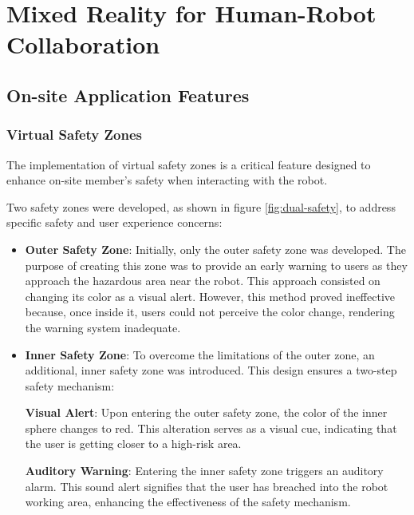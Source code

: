 \chapter{Mixed Reality for Human-Robot Collaboration}%
\label{chapter:on-site}



\section{On-site Application Features}
\label{section:on-site-features}


    
    \subsection{Virtual Safety Zones}
    \label{subsection:virtual-safety-zones} 

        The implementation of virtual safety zones is a critical feature designed to enhance on-site member's safety when interacting with the robot. 

        Two safety zones were developed, as shown in figure \ref{fig:dual-safety}, to address specific safety and user experience concerns:

        \begin{itemize}
            \item \textbf{Outer Safety Zone}: Initially, only the outer safety zone was developed. The purpose of creating this zone was to provide an 
            early warning to users as they approach the hazardous area near the robot. This approach consisted on changing its color as a visual alert. 
            However, this method proved ineffective because, once inside it, users could not perceive the color change, rendering the warning system inadequate.
            
            \item \textbf{Inner Safety Zone}: To overcome the limitations of the outer zone, an additional, inner safety zone was introduced. 
            This design ensures a two-step safety mechanism:

                \textbf{Visual Alert}: Upon entering the outer safety zone, the color of the inner sphere changes to red. 
                This alteration serves as a visual cue, indicating that the user is getting closer to a high-risk area.

                \textbf{Auditory Warning}: Entering the inner safety zone triggers an auditory alarm. This sound alert signifies that the user has 
                breached into the robot working area, enhancing the effectiveness of the safety mechanism.
        \end{itemize}


